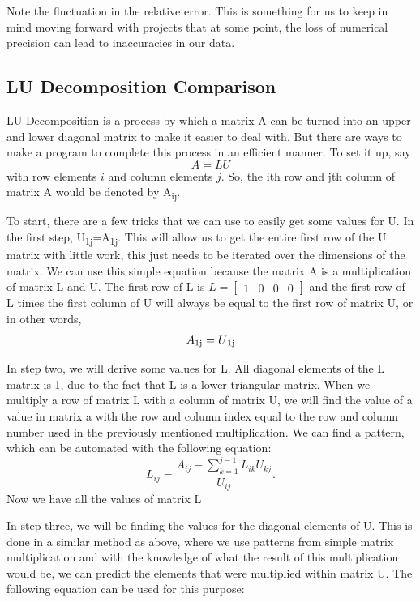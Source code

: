 \documentclass{article}
\begin{document}
Note the fluctuation in the relative error. This is something for us to keep in mind moving forward with projects that at some point, the loss of numerical precision can lead to inaccuracies in our data.

\newpage
\subsection{LU Decomposition Comparison}

LU-Decomposition is a process by which a matrix A can be turned into an upper and lower diagonal matrix to make it easier to deal with. But there are ways to make a program to complete this process in an efficient manner. To set it up, say 
\begin{equation*}
A = LU 
\end{equation*}
with row elements $i$ and column elements $j$. So, the ith row and jth column of matrix A would be denoted by A\textsubscript{ij}. 

To start, there are a few tricks that we can use to easily get some values for U. In the first step, U\textsubscript{1j}=A\textsubscript{1j}. This will allow us to get the entire first row of the U matrix with little work, this just needs to be iterated over the dimensions of the matrix. We can use this simple equation because the matrix A is a multiplication of matrix L and U. The first row of L is 
$L=\begin{bmatrix}
1&0&0&0
\end{bmatrix}$
and the first row of L times the first column of U will always be equal to the first row of matrix U, or in other words,
\begin{equation*}
A\textsubscript{1j}=U\textsubscript{1j}
\end{equation*}

In step two, we will derive some values for L. All diagonal elements of the L matrix is 1, due to the fact that L is a lower triangular matrix. When we multiply a row of matrix L with a column of matrix U, we will find the value of a value in matrix a with the row and column index equal to the row and column number used in the previously mentioned multiplication. We can find a pattern, which can be automated with the following equation:    
\begin{equation*}
L_{ij}=\frac{A_{ij} - \sum_{k=1}^{j-1} L_{ik} U_{kj}} {U_{ij}}.
\end{equation*}
Now we have all the values of matrix L

In step three, we will be finding the values for the diagonal elements of U. This is done in a similar method as above, where we use patterns from simple matrix multiplication and with the knowledge of what the result of this multiplication would be, we can predict the elements that were multiplied within matrix U. The following equation can be used for this purpose:
\end{document}
